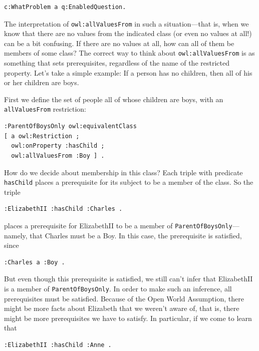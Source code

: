 \begin{lstlisting}
c:WhatProblem a q:EnabledQuestion.
\end{lstlisting}

The interpretation of \texttt{owl:allValuesFrom} in such a situation---that is,
when we know that there are no values from the indicated class (or even
no values at all!) can be a bit confusing. If there are no values at
all, how can all of them be members of some class? The correct way to
think about \texttt{owl:allValuesFrom} is as something that sets prerequisites,
regardless of the name of the restricted property. Let's take a simple
example: If a person has no children, then all of his or her children
are boys.

First we define the set of people all of whose children are boys, with
an \texttt{allValuesFrom}
restriction:

\begin{lstlisting}
:ParentOfBoysOnly owl:equivalentClass
[ a owl:Restriction ;
  owl:onProperty :hasChild ;
  owl:allValuesFrom :Boy ] .
\end{lstlisting}

How do we decide about membership in this class? Each triple with
predicate \texttt{hasChild} places a prerequisite for its subject to be a member
of the class. So the triple

\begin{lstlisting}
:ElizabethII :hasChild :Charles .
\end{lstlisting}

places a prerequisite for ElizabethII to be a member of
\texttt{ParentOfBoysOnly}---namely, that
Charles must be a Boy. In this case, the prerequisite is satisfied, since

\begin{lstlisting}
:Charles a :Boy .
\end{lstlisting}


But even though this prerequisite is satisfied, we still can't infer
that ElizabethII is a member of \texttt{ParentOfBoysOnly}. In order to make such
an inference, all prerequisites must be satisfied. Because of the Open
World Assumption, there might be more facts about Elizabeth that we
weren't
aware of, that is, there might be more prerequisites we have to satisfy.
In particular, if we come to learn that

\begin{lstlisting}
:ElizabethII :hasChild :Anne .
\end{lstlisting}

